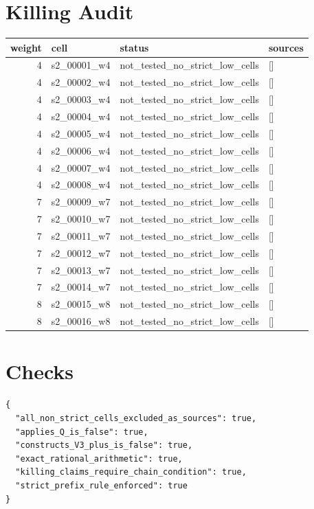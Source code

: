 \documentclass{article}
\begin{document}
\section*{Killing Audit}
\begin{longtable}{rlll}
\toprule weight & cell & status & sources \\
\midrule
4 & s2\_00001\_w4 & not\_tested\_no\_strict\_low\_cells & [] \\
4 & s2\_00002\_w4 & not\_tested\_no\_strict\_low\_cells & [] \\
4 & s2\_00003\_w4 & not\_tested\_no\_strict\_low\_cells & [] \\
4 & s2\_00004\_w4 & not\_tested\_no\_strict\_low\_cells & [] \\
4 & s2\_00005\_w4 & not\_tested\_no\_strict\_low\_cells & [] \\
4 & s2\_00006\_w4 & not\_tested\_no\_strict\_low\_cells & [] \\
4 & s2\_00007\_w4 & not\_tested\_no\_strict\_low\_cells & [] \\
4 & s2\_00008\_w4 & not\_tested\_no\_strict\_low\_cells & [] \\
7 & s2\_00009\_w7 & not\_tested\_no\_strict\_low\_cells & [] \\
7 & s2\_00010\_w7 & not\_tested\_no\_strict\_low\_cells & [] \\
7 & s2\_00011\_w7 & not\_tested\_no\_strict\_low\_cells & [] \\
7 & s2\_00012\_w7 & not\_tested\_no\_strict\_low\_cells & [] \\
7 & s2\_00013\_w7 & not\_tested\_no\_strict\_low\_cells & [] \\
7 & s2\_00014\_w7 & not\_tested\_no\_strict\_low\_cells & [] \\
8 & s2\_00015\_w8 & not\_tested\_no\_strict\_low\_cells & [] \\
8 & s2\_00016\_w8 & not\_tested\_no\_strict\_low\_cells & [] \\
\bottomrule
\end{longtable}
\section*{Checks}
\begin{verbatim}
{
  "all_non_strict_cells_excluded_as_sources": true,
  "applies_Q_is_false": true,
  "constructs_V3_plus_is_false": true,
  "exact_rational_arithmetic": true,
  "killing_claims_require_chain_condition": true,
  "strict_prefix_rule_enforced": true
}
\end{verbatim}
\end{document}
